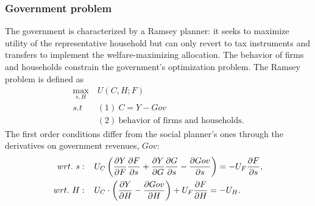 \subsubsection{Government problem}\label{subsec:Rams}
The government is characterized by a Ramsey planner: it seeks to maximize utility of the representative household but can only revert to tax instruments and transfers to implement the welfare-maximizing allocation. The behavior of firms and households constrain the government's optimization problem. 
The Ramsey problem is defined as
\begin{align}
\underset{s, H}{\max}\ & U(C,H; F)\\ s.t\ \ & (1)\  C=Y-Gov\\ & (2) \ \text{behavior of firms and households}.
\end{align}
The first order conditions differ from the social planner's ones through the derivatives on government revenues, $Gov$:
\begin{align}
wrt.\ s:\hspace{4mm} & U_C\left(\frac{\partial Y}{\partial F}\frac{\partial F}{\partial s}+\frac{\partial Y}{\partial G}\frac{\partial G}{\partial s}-\frac{\partial Gov}{ \partial s}\right)=-U_F\frac{\partial F}{\partial s}, \label{eq:sbs}
\\
wrt.\ H:\hspace{4mm} & U_C\cdot \left(\frac{\partial Y}{\partial H}-\frac{\partial Gov}{\partial H}\right)+U_F\frac{\partial F}{\partial H}=-U_H\label{eq:sbh}. 
\end{align}

